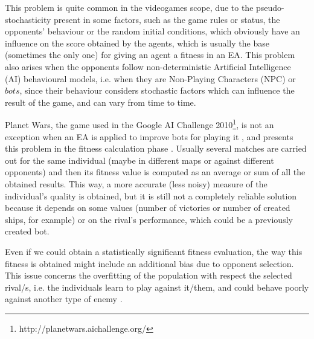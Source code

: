 \documentclass[conference]{IEEEtran}
\begin{document}
This problem is quite common in the videogames scope, due to the
pseudo-stochasticity present in some factors, such as the game rules
or status, the opponents' behaviour or the random initial conditions,
which obviously have an influence on the score obtained by the agents,
which is usually the base (sometimes the only one) for giving an agent  a
fitness in an EA.
This problem also arises when the opponents follow non-deterministic
Artificial Intelligence (AI) behavioural models, i.e. when they are
Non-Playing Characters (NPC) or $bots$, since their behaviour
considers stochastic factors which can influence the result of the
game, and can vary from time to time. %

Planet Wars, the game used in the Google AI Challenge
2010\footnote{http://planetwars.aichallenge.org/}, is not an exception
when an EA is applied to improve bots for playing it
\cite{Genebot-IWANN2011,Genebot_CEC11,Genebot_CIG2012},  and presents
this problem in the fitness calculation phase \cite{Genebot_JCST}. Usually several matches are carried out for the same
individual (maybe in different maps or against different opponents)
and then its fitness value is computed as an average or sum of all the obtained results. This way, a more accurate (less noisy) measure of the individual's quality is obtained, but it is still not a completely reliable solution because it depends on some values (number of victories or number of created ships, for example) or on the rival's performance, which could be a previously created bot.


Even if we could obtain a statistically significant fitness
evaluation, the way this fitness is obtained might include an additional
bias due to opponent selection. This issue concerns the overfitting
of the population with respect the selected rival/s, i.e. the
individuals learn to play against it/them, and could behave poorly
against another type of enemy \cite{Genebot_JCST,wilcoxon:ga}.

\end{document}
